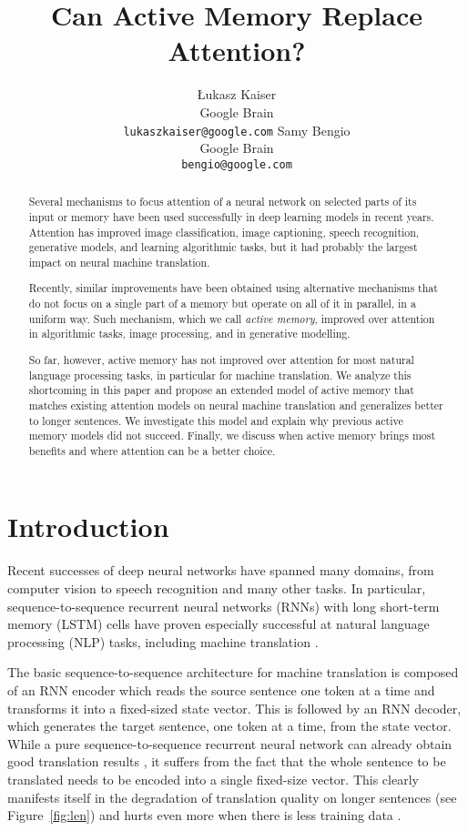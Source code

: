 \documentclass{article}
\title{Can Active Memory Replace Attention?}
\author{{\L}ukasz Kaiser\\ Google Brain\\ \texttt{lukaszkaiser@google.com}
\And Samy Bengio\\ Google Brain\\ \texttt{bengio@google.com}
}
\begin{document}
\maketitle

\begin{abstract}
Several mechanisms to focus attention of a neural network on
selected parts of its input or memory have been used successfully
in deep learning models in recent years. Attention has improved
image classification, image captioning, speech recognition,
generative models, and learning algorithmic tasks, but it
had probably the largest impact on neural machine translation.

Recently, similar improvements have been obtained using alternative
mechanisms that do not focus on a single part of a memory
but operate on all of it in parallel, in a uniform way.
Such mechanism, which we call \emph{active memory}, improved over
attention in algorithmic tasks, image processing, and in generative modelling.

So far, however, active memory has not improved over
attention for most natural language processing tasks,
in particular for machine translation. We analyze this
shortcoming in this paper and propose an extended model of
active memory that matches existing attention models on neural
machine translation and generalizes better to longer sentences.
We investigate this model and explain why previous
active memory models did not succeed. Finally, we discuss
when active memory brings most benefits
and where attention can be a better choice.
\end{abstract}

\section{Introduction}

Recent successes of deep neural networks have spanned many
domains, from computer vision \cite{img12} to
speech recognition \cite{dahl12} and many other tasks.
In particular, sequence-to-sequence recurrent neural networks (RNNs)
with long short-term memory (LSTM) cells \cite{hochreiter1997}
have proven especially successful at natural language
processing (NLP) tasks, including machine translation
\cite{sutskever14,bahdanau2014neural,cho2014learning}.

The basic sequence-to-sequence architecture for machine translation
is composed of an RNN encoder which reads the source sentence
one token at a time and transforms it into a fixed-sized state vector.
This is followed by an RNN decoder, which generates the target sentence,
one token at a time, from the state vector.
While a pure sequence-to-sequence recurrent neural network can already
obtain good translation results \cite{sutskever14,cho2014learning},
it suffers from the fact that the whole sentence to be translated
needs to be encoded into a single fixed-size vector. This clearly
manifests itself in the degradation of translation quality
on longer sentences (see Figure~\ref{fig:len}) and
hurts even more when there is less training data \cite{KVparse15}.
\end{document}
